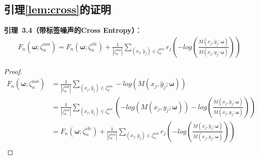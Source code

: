 \chapter{}
\section{引理\ref{lem:cross}的证明}\label{app:lemma4}
\noindent \textbf{引理~3.4（带标签噪声的Cross Entropy）}：
\begin{multline}
F_n\left(\boldsymbol{\omega};\zeta_n^{noi}\right)=F_n\left(\boldsymbol{\omega};\zeta_n^{cle}\right)+\frac{1}{|\zeta_n^{noi}|}\sum_{\left(x_j,\hat{y}_j\right)\in \zeta_n^{noi}}r_j\left(-log\left(\frac{M\left(x_j, \hat{y}_j; \boldsymbol{\omega}\right)}{M\left(x_j, y_j; \boldsymbol{\omega}\right)}\right)\right)
\end{multline}

\begin{proof}
\begin{equation}\label{Derivation of noise loss function}
\begin{aligned}
    F_n\left(\boldsymbol{\omega};\zeta_n^{noi}\right)&=\frac{1}{|\zeta_n^{noi}|}\sum_{\left(x_j,\hat{y}_j\right)\in \zeta_n^{noi}}-log\left(M\left(x_j, \hat{y}_j; \boldsymbol{\omega}\right)\right)\\
    &=\frac{1}{|\zeta_n^{noi}|}\sum_{\left(x_j,\hat{y}_j\right)\in \zeta_n^{noi}}\left(-log\left(M\left(x_j, y_j; \boldsymbol{\omega}\right)\right)-log\left(\frac{M\left(x_j, \hat{y}_j; \boldsymbol{\omega}\right)}{M\left(x_j, y_j; \boldsymbol{\omega}\right)}\right)\right)\\
&=F_n\left(\boldsymbol{\omega};\zeta_n^{cle}\right)+\frac{1}{|\zeta_n^{noi}|}\sum_{\left(x_j,\hat{y}_j\right)\in \zeta_n^{noi}}r_j\left(-log\left(\frac{M\left(x_j, \hat{y}_j; \boldsymbol{\omega}\right)}{M\left(x_j, y_j; \boldsymbol{\omega}\right)}\right)\right)\\
\end{aligned}
\end{equation}
\end{proof}



